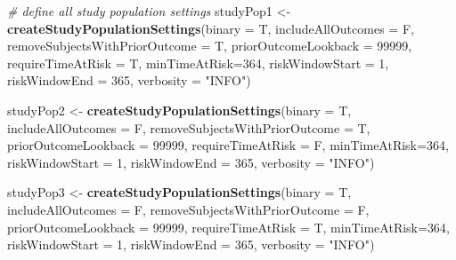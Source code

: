 \documentclass[
]{article}
\newenvironment{Shaded}{\begin{snugshade}}{\end{snugshade}}
\newcommand{\CommentTok}[1]{\textcolor[rgb]{0.56,0.35,0.01}{\textit{#1}}}
\newcommand{\DataTypeTok}[1]{\textcolor[rgb]{0.13,0.29,0.53}{#1}}
\newcommand{\DecValTok}[1]{\textcolor[rgb]{0.00,0.00,0.81}{#1}}
\newcommand{\KeywordTok}[1]{\textcolor[rgb]{0.13,0.29,0.53}{\textbf{#1}}}
\newcommand{\NormalTok}[1]{#1}
\newcommand{\StringTok}[1]{\textcolor[rgb]{0.31,0.60,0.02}{#1}}
\begin{document}
\begin{Shaded}
\begin{Highlighting}[]
\CommentTok{# define all study population settings}
\NormalTok{studyPop1 <-}\StringTok{ }\KeywordTok{createStudyPopulationSettings}\NormalTok{(}\DataTypeTok{binary =}\NormalTok{ T,}
                                          \DataTypeTok{includeAllOutcomes =}\NormalTok{ F,}
                                          \DataTypeTok{removeSubjectsWithPriorOutcome =}\NormalTok{ T,}
                                          \DataTypeTok{priorOutcomeLookback =} \DecValTok{99999}\NormalTok{,}
                                          \DataTypeTok{requireTimeAtRisk =}\NormalTok{ T,}
                                          \DataTypeTok{minTimeAtRisk=}\DecValTok{364}\NormalTok{,}
                                          \DataTypeTok{riskWindowStart =} \DecValTok{1}\NormalTok{,}
                                          \DataTypeTok{riskWindowEnd =} \DecValTok{365}\NormalTok{,}
                                          \DataTypeTok{verbosity =} \StringTok{"INFO"}\NormalTok{)}

\NormalTok{studyPop2 <-}\StringTok{ }\KeywordTok{createStudyPopulationSettings}\NormalTok{(}\DataTypeTok{binary =}\NormalTok{ T,}
                                           \DataTypeTok{includeAllOutcomes =}\NormalTok{ F,}
                                           \DataTypeTok{removeSubjectsWithPriorOutcome =}\NormalTok{ T,}
                                           \DataTypeTok{priorOutcomeLookback =} \DecValTok{99999}\NormalTok{,}
                                           \DataTypeTok{requireTimeAtRisk =}\NormalTok{ F,}
                                           \DataTypeTok{minTimeAtRisk=}\DecValTok{364}\NormalTok{,}
                                           \DataTypeTok{riskWindowStart =} \DecValTok{1}\NormalTok{,}
                                           \DataTypeTok{riskWindowEnd =} \DecValTok{365}\NormalTok{,}
                                           \DataTypeTok{verbosity =} \StringTok{"INFO"}\NormalTok{)}

\NormalTok{studyPop3 <-}\StringTok{ }\KeywordTok{createStudyPopulationSettings}\NormalTok{(}\DataTypeTok{binary =}\NormalTok{ T,}
                                           \DataTypeTok{includeAllOutcomes =}\NormalTok{ F,}
                                           \DataTypeTok{removeSubjectsWithPriorOutcome =}\NormalTok{ F,}
                                           \DataTypeTok{priorOutcomeLookback =} \DecValTok{99999}\NormalTok{,}
                                           \DataTypeTok{requireTimeAtRisk =}\NormalTok{ T,}
                                           \DataTypeTok{minTimeAtRisk=}\DecValTok{364}\NormalTok{,}
                                           \DataTypeTok{riskWindowStart =} \DecValTok{1}\NormalTok{,}
                                           \DataTypeTok{riskWindowEnd =} \DecValTok{365}\NormalTok{,}
                                           \DataTypeTok{verbosity =} \StringTok{"INFO"}\NormalTok{)}
                                           

\end{Highlighting}
\end{Shaded}
\end{document}
